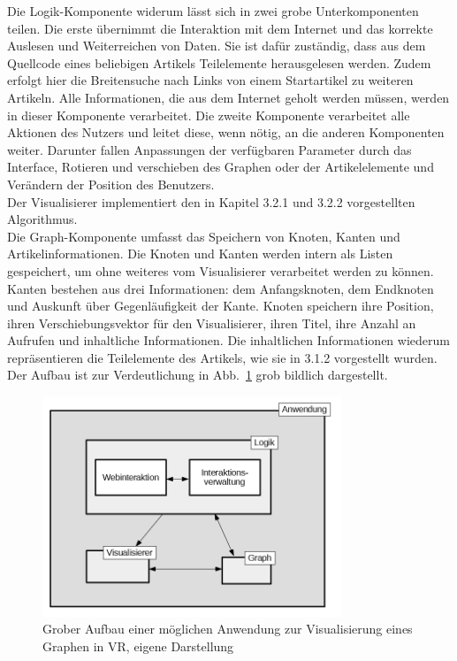 \documentclass[12pt, a4paper]{article}
\begin{document}
Die Logik-Komponente widerum lässt sich in zwei grobe Unterkomponenten teilen. Die erste übernimmt die Interaktion mit dem Internet und das korrekte Auslesen und Weiterreichen von Daten. Sie ist dafür zuständig, dass aus dem Quellcode eines beliebigen Artikels Teilelemente herausgelesen werden. Zudem erfolgt hier die Breitensuche nach Links von einem Startartikel zu weiteren Artikeln. Alle Informationen, die aus dem Internet geholt werden müssen, werden in dieser Komponente verarbeitet. Die zweite Komponente verarbeitet alle Aktionen des Nutzers und leitet diese, wenn nötig, an die anderen Komponenten weiter. Darunter fallen Anpassungen der verfügbaren Parameter durch das Interface, Rotieren und verschieben des Graphen oder der Artikelelemente und Verändern der Position des Benutzers.\\

Der Visualisierer implementiert den in Kapitel 3.2.1 und 3.2.2 vorgestellten Algorithmus.\\

Die Graph-Komponente umfasst das Speichern von Knoten, Kanten und Artikelinformationen. Die Knoten und Kanten werden intern als Listen gespeichert, um ohne weiteres vom Visualisierer verarbeitet werden zu können. Kanten bestehen aus drei Informationen: dem Anfangsknoten, dem Endknoten und Auskunft über Gegenläufigkeit der Kante. Knoten speichern ihre Position, ihren Verschiebungsvektor für den Visualisierer, ihren Titel, ihre Anzahl an Aufrufen und inhaltliche Informationen. Die inhaltlichen Informationen wiederum repräsentieren die Teilelemente des Artikels, wie sie in 3.1.2 vorgestellt wurden.\\

Der Aufbau ist zur Verdeutlichung in Abb.~\ref{anwendungAufbau} grob bildlich dargestellt.\\

\begin{figure}
\centering
\includegraphics[width=0.8\textwidth]{Anwendung_Struktur.png}
\caption[Grober Aufbau einer möglichen Anwendung zur Visualisierung eines Graphen in VR]{Grober Aufbau einer möglichen Anwendung zur Visualisierung eines Graphen in VR, eigene Darstellung}
\label{anwendungAufbau}
\end{figure}
\end{document}
